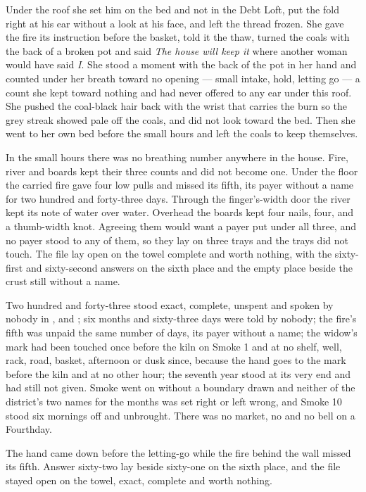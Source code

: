 Under the roof she set him on the bed and not in the Debt Loft, put the fold right at his ear without a look at his face, and left the thread frozen. She gave the fire its instruction before the basket, told it the thaw, turned the coals with the back of a broken pot and said \emph{The house will keep it} where another woman would have said \emph{I}. She stood a moment with the back of the pot in her hand and counted under her breath toward no opening --- small intake, hold, letting go --- a count she kept toward nothing and had never offered to any ear under this roof. She pushed the coal-black hair back with the wrist that carries the burn so the grey streak showed pale off the coals, and did not look toward the bed. Then she went to her own bed before the small hours and left the coals to keep themselves.

In the small hours there was no breathing number anywhere in the house. Fire, river and boards kept their three counts and did not become one. Under the floor the carried fire gave four low pulls and missed its fifth, its payer without a name for two hundred and forty-three days. Through the finger's-width door the river kept its note of water over water. Overhead the boards kept four nails, four, and a thumb-width knot. Agreeing them would want a payer put under all three, and no payer stood to any of them, so they lay on three trays and the trays did not touch. The file lay open on the towel complete and worth nothing, with the sixty-first and sixty-second answers on the sixth place and the empty place beside the crust still without a name.

Two hundred and forty-three stood exact, complete, unspent and spoken by nobody in ,  and ; six months and sixty-three days were told by nobody; the fire's fifth was unpaid the same number of days, its payer without a name; the widow's mark had been touched once before the kiln on Smoke 1 and at no shelf, well, rack, road, basket, afternoon or dusk since, because the hand goes to the mark before the kiln and at no other hour; the seventh year stood at its very end and had still not given. Smoke went on without a boundary drawn and neither of the district's two names for the months was set right or left wrong, and Smoke 10 stood six mornings off and unbrought. There was no market, no  and no bell on a Fourthday.

The hand came down before the letting-go while the fire behind the wall missed its fifth. Answer sixty-two lay beside sixty-one on the sixth place, and the file stayed open on the towel, exact, complete and worth nothing.
